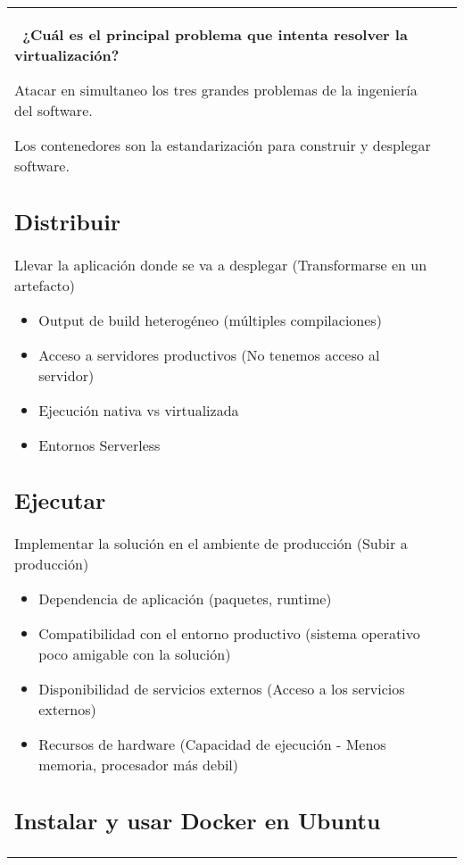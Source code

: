 \documentclass[letterpaper,11pt]{article}
\begin{document}
\begin{tabular*}{7in}{l@{\extracolsep{\fill}}r}
    {\bf\ ¿Cuál es el principal problema que intenta resolver la virtualización?}
    
    \par Atacar en simultaneo los tres grandes problemas de la ingeniería del software.
    
    Los contenedores son la estandarización para construir y desplegar software.
    
    \subsection{Distribuir}
    Llevar la aplicación donde se va a desplegar (Transformarse en un artefacto)
    
    \begin{itemize}
        \item Output de build heterogéneo (múltiples compilaciones)
        \item Acceso a servidores productivos (No tenemos acceso al servidor)
        \item Ejecución nativa vs virtualizada
        \item Entornos Serverless
    \end{itemize}
    
    \subsection{Ejecutar}
    Implementar la solución en el ambiente de producción (Subir a producción)
    
    \begin{itemize}
        \item Dependencia de aplicación (paquetes, runtime)
        \item Compatibilidad con el entorno productivo (sistema operativo poco amigable con la solución)
        \item Disponibilidad de servicios externos (Acceso a los servicios externos)
        \item Recursos de hardware (Capacidad de ejecución - Menos memoria, procesador más debil)
    \end{itemize}
    
    \subsection{Instalar y usar Docker en Ubuntu}
    

\end{tabular*}
\end{document}
